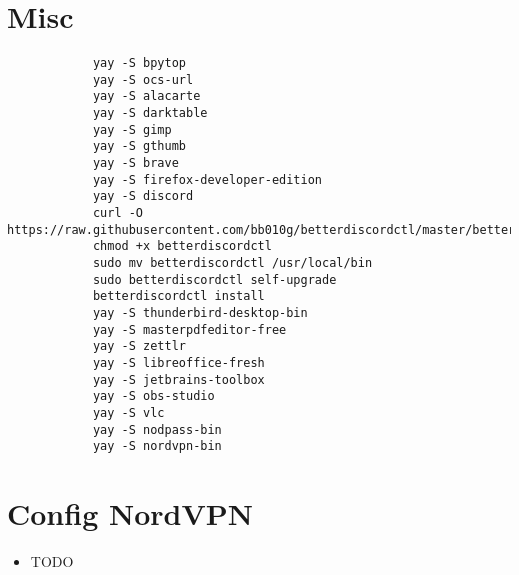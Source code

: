 \documentclass[12pt]{article}
\begin{document}
    \section{Misc}\label{sec:misc}
        \begin{verbatim}
            yay -S bpytop
            yay -S ocs-url
            yay -S alacarte
            yay -S darktable
            yay -S gimp
            yay -S gthumb
            yay -S brave
            yay -S firefox-developer-edition
            yay -S discord
            curl -O https://raw.githubusercontent.com/bb010g/betterdiscordctl/master/betterdiscordctl
            chmod +x betterdiscordctl
            sudo mv betterdiscordctl /usr/local/bin
            sudo betterdiscordctl self-upgrade
            betterdiscordctl install
            yay -S thunderbird-desktop-bin
            yay -S masterpdfeditor-free
            yay -S zettlr
            yay -S libreoffice-fresh
            yay -S jetbrains-toolbox
            yay -S obs-studio
            yay -S vlc
            yay -S nodpass-bin
            yay -S nordvpn-bin
        \end{verbatim}

    \section{Config NordVPN}\label{sec:config-nordvpn}
        \begin{itemize}
            \item TODO
        \end{itemize}
\end{document}
